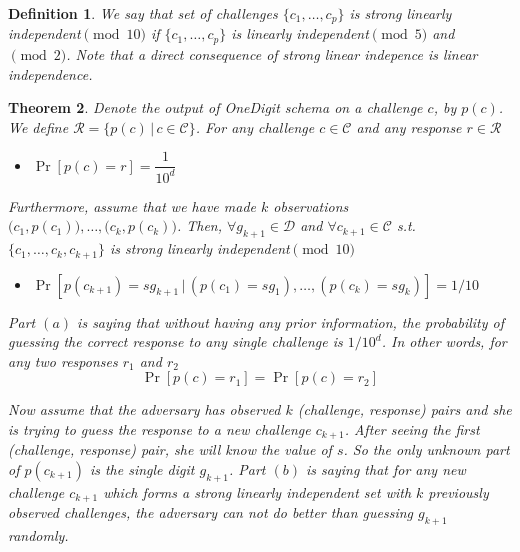 \documentclass{article}
\newtheorem{theorem}{Theorem}
\newtheorem{definition}[theorem]{Definition}
\begin{document}
\begin{definition}
We say that set of challenges $\{c_1,\ldots,c_p\}$ is strong linearly independent$\pmod{10}$ if $\{c_1,\ldots,c_p\}$ is linearly independent$\pmod{5}$ and$\pmod{2}$. Note that a direct consequence of strong linear indepence is linear independence.
\end{definition}
                                                                                                            

\begin{theorem}
\label{thm:main}
	Denote the output of OneDigit schema on a challenge $c$, by $p(c)$. We define $\mathcal{R}=\{p(c) \, | \, c\in\mathcal{C}\}$. For any challenge $c\in \mathcal{C}$ and any response $r\in \mathcal{R}$
	\begin{itemize} 
		\item[$(a)$]$\Pr[p(c)=r]=\dfrac{1}{10^d}$
	\end{itemize}
Furthermore, assume that we have made $k$ observations $\big(c_1,p(c_1)\big),\ldots, \big(c_k, p(c_k)\big)$. Then, $\forall g_{k+1}\in\mathcal{D}$ and $\forall c_{k+1}\in \mathcal{C}$ s.t. $\{c_1,\ldots,c_k,c_{k+1}\}$ is strong linearly independent$\pmod{10}$ 
	\begin{itemize}
		\item[$(b)$] $\Pr[p(c_{k+1})=s g_{k+1} \, | \, (p(c_1)=s g_1),\ldots, (p(c_k)=s g_k)]=1/10$
	\end{itemize}
Part $(a)$ is saying that without having any prior information, the probability of guessing the correct response to any single challenge is ${1}/{10^d}$. In other words, for any two responses $r_1$ and $r_2$
$$\Pr[p(c)=r_1]=\Pr[p(c)=r_2]$$

\noindent Now assume that the adversary has observed $k$ (challenge, response) pairs and she is trying to guess the response to a new challenge $c_{k+1}$. After seeing the first (challenge, response) pair, she will know the value of $s$. So the only unknown part of $p(c_{k+1})$ is the single digit $g_{k+1}$. Part $(b)$ is saying that for any new challenge $c_{k+1}$ which forms a strong linearly independent set with $k$ previously observed challenges, the adversary can not do better than guessing $g_{k+1}$ randomly.

\end{theorem}
\end{document}
